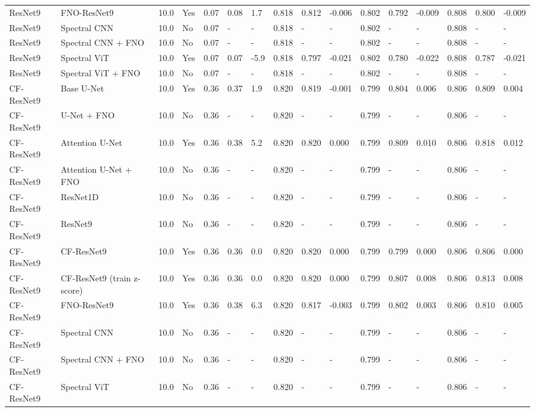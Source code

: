 \begin{longtable}{llllllllllllllll}
ResNet9 & FNO-ResNet9 & 10.0 & Yes & 0.07 & 0.08 & 1.7 & 0.818 & 0.812 & -0.006 & 0.802 & 0.792 & -0.009 & 0.808 & 0.800 & -0.009 \\
ResNet9 & Spectral CNN & 10.0 & No & 0.07 & - & - & 0.818 & - & - & 0.802 & - & - & 0.808 & - & - \\
ResNet9 & Spectral CNN + FNO & 10.0 & No & 0.07 & - & - & 0.818 & - & - & 0.802 & - & - & 0.808 & - & - \\
ResNet9 & Spectral ViT & 10.0 & Yes & 0.07 & 0.07 & -5.9 & 0.818 & 0.797 & -0.021 & 0.802 & 0.780 & -0.022 & 0.808 & 0.787 & -0.021 \\
ResNet9 & Spectral ViT + FNO & 10.0 & No & 0.07 & - & - & 0.818 & - & - & 0.802 & - & - & 0.808 & - & - \\
CF-ResNet9 & Base U-Net & 10.0 & Yes & 0.36 & 0.37 & 1.9 & 0.820 & 0.819 & -0.001 & 0.799 & 0.804 & 0.006 & 0.806 & 0.809 & 0.004 \\
CF-ResNet9 & U-Net + FNO & 10.0 & No & 0.36 & - & - & 0.820 & - & - & 0.799 & - & - & 0.806 & - & - \\
CF-ResNet9 & Attention U-Net & 10.0 & Yes & 0.36 & 0.38 & 5.2 & 0.820 & 0.820 & 0.000 & 0.799 & 0.809 & 0.010 & 0.806 & 0.818 & 0.012 \\
CF-ResNet9 & Attention U-Net + FNO & 10.0 & No & 0.36 & - & - & 0.820 & - & - & 0.799 & - & - & 0.806 & - & - \\
CF-ResNet9 & ResNet1D & 10.0 & No & 0.36 & - & - & 0.820 & - & - & 0.799 & - & - & 0.806 & - & - \\
CF-ResNet9 & ResNet9 & 10.0 & No & 0.36 & - & - & 0.820 & - & - & 0.799 & - & - & 0.806 & - & - \\
CF-ResNet9 & CF-ResNet9 & 10.0 & Yes & 0.36 & 0.36 & 0.0 & 0.820 & 0.820 & 0.000 & 0.799 & 0.799 & 0.000 & 0.806 & 0.806 & 0.000 \\
CF-ResNet9 & CF-ResNet9 (train z-score) & 10.0 & Yes & 0.36 & 0.36 & 0.0 & 0.820 & 0.820 & 0.000 & 0.799 & 0.807 & 0.008 & 0.806 & 0.813 & 0.008 \\
CF-ResNet9 & FNO-ResNet9 & 10.0 & Yes & 0.36 & 0.38 & 6.3 & 0.820 & 0.817 & -0.003 & 0.799 & 0.802 & 0.003 & 0.806 & 0.810 & 0.005 \\
CF-ResNet9 & Spectral CNN & 10.0 & No & 0.36 & - & - & 0.820 & - & - & 0.799 & - & - & 0.806 & - & - \\
CF-ResNet9 & Spectral CNN + FNO & 10.0 & No & 0.36 & - & - & 0.820 & - & - & 0.799 & - & - & 0.806 & - & - \\
CF-ResNet9 & Spectral ViT & 10.0 & No & 0.36 & - & - & 0.820 & - & - & 0.799 & - & - & 0.806 & - & - \\

\end{longtable}
